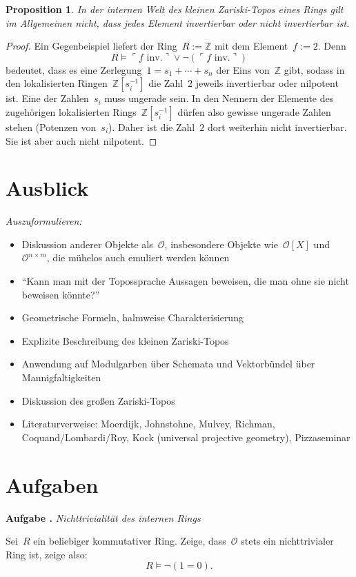 \documentclass[a4paper,ngerman,12pt]{scrartcl}
\theoremstyle{definition}
\theoremstyle{plain}
\newtheorem{prop}[defn]{Proposition}
\theoremstyle{remark}
\newcommand{\ZZ}{\mathbb{Z}}
\renewcommand{\O}{\mathcal{O}}
\renewcommand{\_}{\mathpunct{.}\,}
\newcommand{\?}{\,{:}\,}
\newcommand{\speak}[1]{\ulcorner\text{#1}\urcorner}
\newlength{\aufgabenskip}
\newcounter{aufgabennummer}
\newenvironment{aufgabe}[1]{
  \addtocounter{aufgabennummer}{1}
  \textbf{Aufgabe \theaufgabennummer{}.} \emph{#1} \par
}{\vspace{\aufgabenskip}}
\begin{document}
\begin{prop}In der internen Welt des kleinen Zariski-Topos eines Rings gilt im
Allgemeinen \emph{nicht}, dass jedes Element invertierbar oder nicht
invertierbar ist.\end{prop}
\begin{proof}Ein Gegenbeispiel liefert der Ring~$R := \ZZ$ mit dem Element~$f
:= 2$. Denn
\[ R \models \speak{$f$ inv.} \vee \neg(\speak{$f$ inv.}) \]
bedeutet, dass es eine Zerlegung~$1 = s_1 + \cdots + s_n$ der Eins
von~$\ZZ$ gibt, sodass in den lokalisierten Ringen~$\ZZ[s_i^{-1}]$ die Zahl~$2$
jeweils invertierbar oder nilpotent ist. Eine der Zahlen~$s_i$ muss ungerade
sein. In den Nennern der Elemente des zugehörigen lokalisierten
Rings~$\ZZ[s_i^{-1}]$ dürfen also gewisse ungerade Zahlen stehen (Potenzen
von~$s_i$). Daher ist die Zahl~$2$ dort weiterhin nicht invertierbar. Sie ist
aber auch nicht nilpotent.
\end{proof}


\section{Ausblick}

\emph{Auszuformulieren:}

\begin{itemize}
\item Diskussion anderer Objekte als~$\O$, insbesondere Objekte wie~$\O[X]$
und~$\O^{n \times m}$, die mühelos auch emuliert werden können
\item "`Kann man mit der Topossprache Aussagen
beweisen, die man ohne sie nicht beweisen könnte?"'
\item Geometrische Formeln, halmweise Charakterisierung
\item Explizite Beschreibung des kleinen Zariski-Topos
\item Anwendung auf Modulgarben über Schemata und Vektorbündel über Mannigfaltigkeiten
\item Diskussion des großen Zariski-Topos
\item Literaturverweise: Moerdijk, Johnstohne, Mulvey, Richman,
Coquand/Lombardi/Roy, Kock (universal projective geometry), Pizzaseminar
\end{itemize}


\appendix
\section{Aufgaben}

\begin{aufgabe}{Nichttrivialität des internen Rings}
Sei~$R$ ein beliebiger kommutativer Ring. Zeige, dass~$\O$ stets ein
nichttrivialer Ring ist, zeige also:
\[ R \models \neg(1 = 0). \]
\end{aufgabe}
\vspace{-1.5em}
\end{document}
